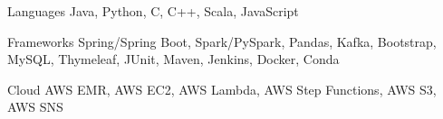 
\begin{cvskills}
  \cvskill
    {Languages} %
    {Java, Python, C, C++, Scala, JavaScript} %

  \cvskill
    {Frameworks} %
    {Spring/Spring Boot, Spark/PySpark, Pandas, Kafka, Bootstrap, MySQL, Thymeleaf, JUnit, Maven, Jenkins, Docker, Conda} %
    
  \cvskill
    {Cloud} %
    {AWS EMR, AWS EC2, AWS Lambda, AWS Step Functions, AWS S3, AWS SNS} %
\end{cvskills}
